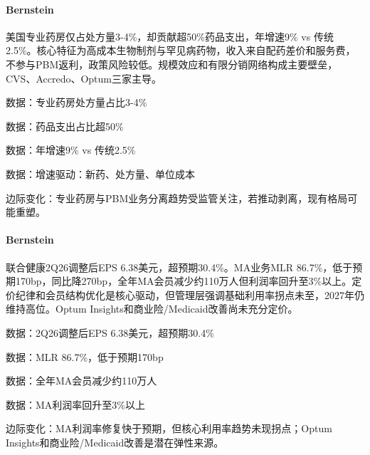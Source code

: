 \documentclass[11pt]{ctexart}
\begin{document}
\paragraph{Bernstein} 美国专业药房仅占处方量3-4\%，却贡献超50\%药品支出，年增速9\% vs 传统2.5\%。核心特征为高成本生物制剂与罕见病药物，收入来自配药差价和服务费，不参与PBM返利，政策风险较低。规模效应和有限分销网络构成主要壁垒，CVS、Accredo、Optum三家主导。
{\small\color{refgray}数据：专业药房处方量占比3-4\%\par}
{\small\color{refgray}数据：药品支出占比超50\%\par}
{\small\color{refgray}数据：年增速9\% vs 传统2.5\%\par}
{\small\color{refgray}数据：增速驱动：新药、处方量、单位成本\par}
{\small\color{refgray}边际变化：专业药房与PBM业务分离趋势受监管关注，若推动剥离，现有格局可能重塑。\par}
\paragraph{Bernstein} 联合健康2Q26调整后EPS 6.38美元，超预期30.4\%。MA业务MLR 86.7\%，低于预期170bp，同比降270bp，全年MA会员减少约110万人但利润率回升至3\%以上。定价纪律和会员结构优化是核心驱动，但管理层强调基础利用率拐点未至，2027年仍维持高位。Optum Insights和商业险/Medicaid改善尚未充分定价。
{\small\color{refgray}数据：2Q26调整后EPS 6.38美元，超预期30.4\%\par}
{\small\color{refgray}数据：MLR 86.7\%，低于预期170bp\par}
{\small\color{refgray}数据：全年MA会员减少约110万人\par}
{\small\color{refgray}数据：MA利润率回升至3\%以上\par}
{\small\color{refgray}边际变化：MA利润率修复快于预期，但核心利用率趋势未现拐点；Optum Insights和商业险/Medicaid改善是潜在弹性来源。\par}
\end{document}
